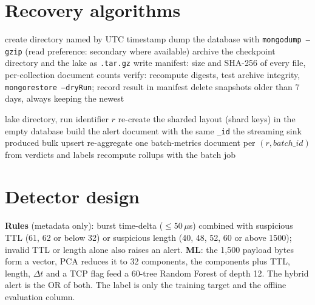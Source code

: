 \section{Recovery algorithms}
\begin{algorithm}[H]
\caption{Snapshot backup, verification and rotation} \label{alg:backup}
\begin{algorithmic}[1]
\State create directory named by UTC timestamp
\State dump the database with \texttt{mongodump --gzip} (read preference: secondary where available)
\State archive the checkpoint directory and the lake as \texttt{.tar.gz}
\State write manifest: size and SHA-256 of every file, per-collection document counts
\State verify: recompute digests, test archive integrity, \texttt{mongorestore --dryRun}; record result in manifest
\State delete snapshots older than 7 days, always keeping the newest
\end{algorithmic}
\end{algorithm}

\begin{algorithm}[H]
\caption{Rebuild MongoDB from the Parquet lake} \label{alg:lake}
\begin{algorithmic}[1]
\Require lake directory, run identifier $r$
\State re-create the sharded layout (shard keys) in the empty database
  \State build the alert document with the same \texttt{\_id} the streaming sink produced
  \State bulk upsert
\EndFor
\State re-aggregate one batch-metrics document per $(r, batch\_id)$ from verdicts and labels
\State recompute rollups with the batch job
\end{algorithmic}
\end{algorithm}

\section{Detector design}
\paragraph{}
\textbf{Rules} (metadata only): burst time-delta ($\le 50\,\mu$s) combined with suspicious TTL (61, 62 or below 32) or suspicious length (40, 48, 52, 60 or above 1500); invalid TTL or length alone also raises an alert. \textbf{ML}: the 1,500 payload bytes form a vector, PCA reduces it to 32 components, the components plus TTL, length, $\Delta t$ and a TCP flag feed a 60-tree Random Forest of depth 12. The hybrid alert is the OR of both. The label is only the training target and the offline evaluation column.


